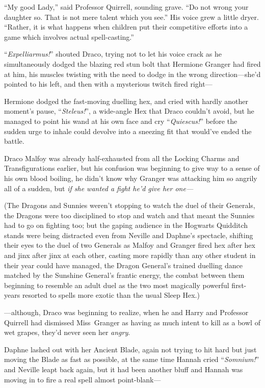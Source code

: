 “My good Lady,” said Professor Quirrell, sounding grave. “Do not wrong your daughter so. That is not mere talent which you see.” His voice grew a little dryer. “Rather, it is what happens when children put their competitive efforts into a game which involves actual spell-casting.”

\later

“\emph{Expelliarmus!}” shouted Draco, trying not to let his voice crack as he simultaneously dodged the blazing red stun bolt that Hermione Granger had fired at him, his muscles twisting with the need to dodge in the wrong direction—she’d pointed to his left, and then with a mysterious twitch fired right—

Hermione dodged the fast-moving duelling hex, and cried with hardly another moment’s pause, “\emph{Steleus!}”, a wide-angle Hex that Draco couldn’t avoid, but he managed to point his wand at his own face and cry “\emph{Quiescus!}” before the sudden urge to inhale could devolve into a sneezing fit that would’ve ended the battle.

Draco Malfoy was already half-exhausted from all the Locking Charms and Transfigurations earlier, but his confusion was beginning to give way to a sense of his own blood boiling, he didn’t know why Granger was attacking him so angrily all of a sudden, but \emph{if she wanted a fight he’d give her one—}

(The Dragons and Sunnies weren’t stopping to watch the duel of their Generals, the Dragons were too disciplined to stop and watch and that meant the Sunnies had to go on fighting too; but the gaping audience in the Hogwarts Quidditch stands were being distracted even from Neville and Daphne’s spectacle, shifting their eyes to the duel of two Generals as Malfoy and Granger fired hex after hex and jinx after jinx at each other, casting more rapidly than any other student in their year could have managed, the Dragon General’s trained duelling dance matched by the Sunshine General’s frantic energy, the combat between them beginning to resemble an adult duel as the two most magically powerful first-years resorted to spells more exotic than the usual Sleep Hex.)

—although, Draco was beginning to realize, when he and Harry and Professor Quirrell had dismissed Miss~Granger as having as much intent to kill as a bowl of wet grapes, they’d never seen her \emph{angry}.

\later

Daphne lashed out with her Ancient Blade, again not trying to hit hard but just moving the Blade as fast as possible, at the same time Hannah cried “\emph{Somnium!}” and Neville leapt back again, but it had been another bluff and Hannah was moving in to fire a real spell almost point-blank—

